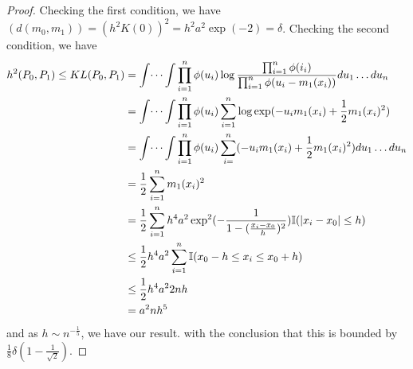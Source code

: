 \begin{proof}
  Checking the first condition, we have $(d(m_{0}, m_{1})) = (h^{2}
  K(0))^{2} = h^{2} a^{2} \exp(-2) = \delta$.
  Checking the second condition, we have
  \begin{align}
    \label{eq:117}
    h^{2}(P_{0}, P_{1}) \leq KL(P_{0}, P_{1}) &= \int \dots \int \prod_{i=1}^{n} \phi(u_{i}) \log
    \frac{\prod_{i=1}^{n} \phi(i_{i})}{\prod_{i=1}^{n} \phi(u_{i} -
      m_{1}(x_{i}))} d u_{1} \dots d u_{n} \\
    &= \int \dots \int \prod_{i=1}^{n} \phi(u_{i}) \sum_{i=1}^{n} \log
    \exp(- u_{i} m_{1}(x_{i}) + \frac{1}{2} m_{1}(x_{i})^{2}) \\
    &= \int \dots \int \prod_{i=1}^{n} \phi(u_{i}) \sum_{i=}^{n}  ( -
    u_{i} m_{1}(x_{i}) + \frac{1}{2} m_{1}(x_{i})^{2}) d u_{1} \dots
    du_{n} \\
    &= \frac{1}{2} \sum_{i=1}^{n} m_{1}(x_{i})^{2} \\
    &= \frac{1}{2} \sum_{i=1}^{n} h^{4} a^{2} \exp^{2}(-\frac{1}{1 -
      (\frac{x_{i} - x_{0}}{h})^{2}}) \I{|x_{i} - x_{0}| \leq h} \\
    &\leq \frac{1}{2} h^{4} a^{2} \sum_{i=1}^{n} \I{x_{0} - h \leq
      x_{i} \leq x_{0} + h} \\
    &\leq \frac{1}{2} h^{4} a^{2} 2nh \\
    &= a^{2} nh^{5}
  \end{align}
  and as $h \sim n^{-\frac{1}{5}}$, we have our result.
  with the conclusion that this is bounded by $\frac{1}{8} \delta(1 -
  \frac{1}{\sqrt{2}})$.
\end{proof}

